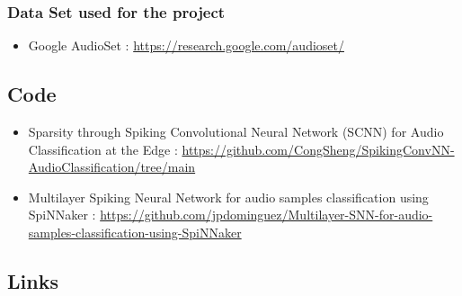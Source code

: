 \documentclass[11pt]{article}
\begin{document}
\subsubsection*{Data Set used for the project}

\begin{itemize}
  \item Google AudioSet : \url{https://research.google.com/audioset/}
        \label{item:google-audioset}

\end{itemize}



\subsection{Code}

\begin{itemize}
  \item Sparsity through Spiking Convolutional Neural Network (SCNN) for Audio Classification at the Edge : \url{https://github.com/CongSheng/SpikingConvNN-AudioClassification/tree/main}
        \label{item:SCNN-audio-classification}
  \item Multilayer Spiking Neural Network for audio samples classification using SpiNNaker : \url{https://github.com/jpdominguez/Multilayer-SNN-for-audio-samples-classification-using-SpiNNaker}
        \label{item:spinnaker-audio-classification}

\end{itemize}

\subsection{Links}

\pagebreak



\end{document}
